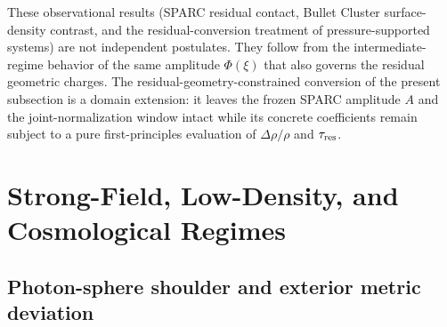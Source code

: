 \documentclass[11pt,a4paper]{article}
\begin{document}
These observational results (SPARC residual contact, Bullet Cluster surface-density contrast, and the residual-conversion treatment of pressure-supported systems) are not independent postulates. They follow from the intermediate-regime behavior of the same amplitude \(\Phi(\xi)\) that also governs the residual geometric charges. The residual-geometry-constrained conversion of the present subsection is a domain extension: it leaves the frozen SPARC amplitude \(A\) and the joint-normalization window intact while its concrete coefficients remain subject to a pure first-principles evaluation of \(\Delta\rho/\rho\) and \(\tau_{\rm res}\).

\section{Strong-Field, Low-Density, and Cosmological Regimes}
\label{sec:strong}

\subsection{Photon-sphere shoulder and exterior metric deviation}
\label{sec:photon-sphere}
\end{document}
